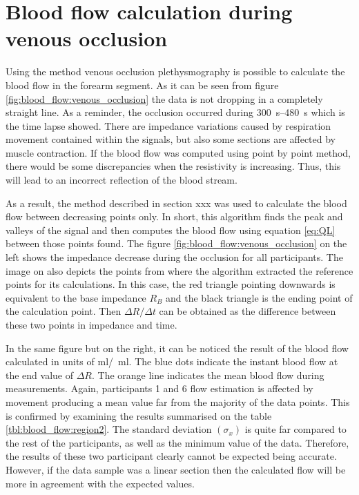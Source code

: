 \section{Blood flow calculation during venous occlusion}
\label{section5.2}
Using the method venous occlusion plethysmography is possible to calculate the blood flow in the forearm segment. As it can be seen from figure \ref{fig:blood_flow:venous_occlusion} the data is not dropping in a completely straight line. As a reminder, the occlusion occurred during \SIrange{300}{480}{\second} which is the time lapse showed. There are impedance variations caused by respiration movement contained within the signals, but also some sections are affected by muscle contraction. If the blood flow was computed using point by point method, there would be some discrepancies when the resistivity is increasing. Thus, this will lead to an incorrect reflection of the blood stream. 

As a result, the method described in section xxx was used to calculate the blood flow between decreasing points only. In short, this algorithm finds the peak and valleys of the signal and then computes the blood flow using equation \ref{eq:QL} between those points found. The figure \ref{fig:blood_flow:venous_occlusion} on the left shows the impedance decrease during the occlusion for all participants. The image on also depicts the points from where the algorithm extracted the reference points for its calculations. In this case, the red triangle pointing downwards is equivalent to the base impedance $R_B$ and the black triangle is the ending point of the calculation point. Then $\Delta R / \Delta t$ can be obtained as the difference between these two points in impedance and time. 

In the same figure but on the right, it can be noticed the result of the blood flow calculated in units of \si{\ml /  \ml}. The blue dots indicate the instant blood flow at the end value of $\Delta R$. The orange line indicates the mean blood flow during measurements. Again, participants 1 and 6 flow estimation is affected by movement producing a mean value far from the majority of the data points. This is confirmed by examining the results summarised on the table \ref{tbl:blood_flow:region2}. The standard deviation $(\sigma_x)$ is quite far compared to the rest of the participants, as well as the minimum value of the data. Therefore, the results of these two participant clearly cannot be expected being accurate. However, if the data sample was a linear section then the calculated flow will be more in agreement with the expected values. 

